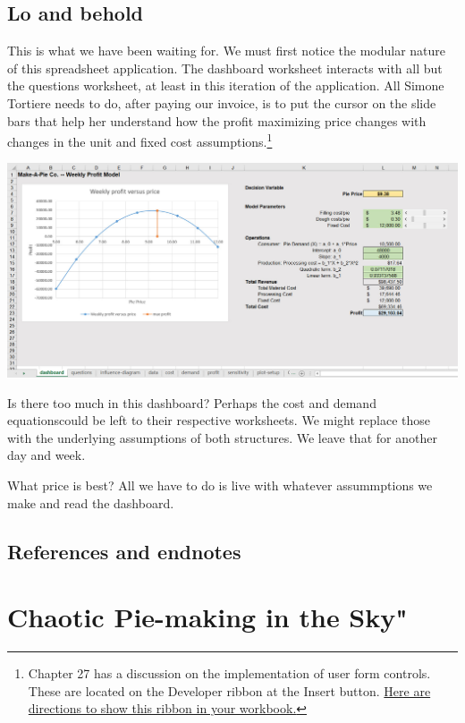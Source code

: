 \documentclass[
]{book}
\begin{document}
\hypertarget{lo-and-behold}{%
\section{Lo and behold}\label{lo-and-behold}}

This is what we have been waiting for. We must first notice the modular nature of this spreadsheet application. The dashboard worksheet interacts with all but the questions worksheet, at least in this iteration of the application. All Simone Tortiere needs to do, after paying our invoice, is to put the cursor on the slide bars that help her understand how the profit maximizing price changes with changes in the unit and fixed cost assumptions.\footnote{\citet{Winston2019} Chapter 27 has a discussion on the implementation of user form controls. These are located on the Developer ribbon at the Insert button. \href{https://support.microsoft.com/en-us/topic/show-the-developer-tab-e1192344-5e56-4d45-931b-e5fd9bea2d45}{Here are directions to show this ribbon in your workbook.}}

\includegraphics{images/01/pie-dashboard.jpg}

Is there too much in this dashboard? Perhaps the cost and demand equationscould be left to their respective worksheets. We might replace those with the underlying assumptions of both structures. We leave that for another day and week.

What price is best? All we have to do is live with whatever assummptions we make and read the dashboard.

\hypertarget{references-and-endnotes}{%
\section{References and endnotes}\label{references-and-endnotes}}

\hypertarget{chaotic-pie-making-in-the-sky}{%
\chapter{Chaotic Pie-making in the Sky"}\label{chaotic-pie-making-in-the-sky}}
\end{document}
